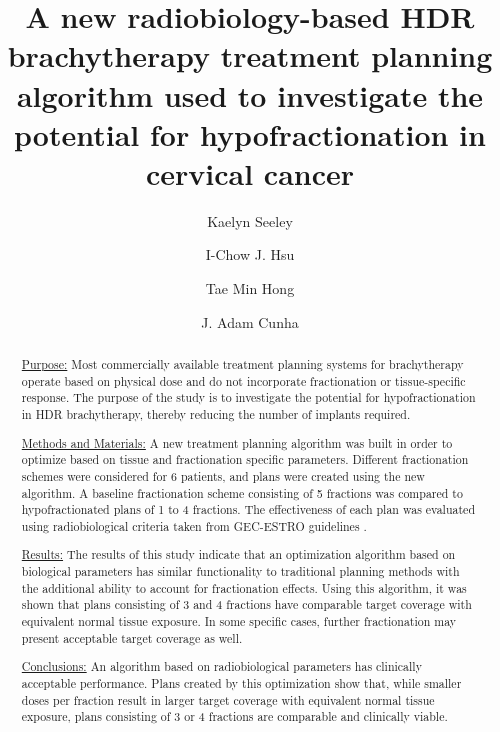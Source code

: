 \documentclass[osajnl,twocolumn,showpacs,superscriptaddress,10pt]{revtex4-1}
\begin{document}
\title{A new radiobiology-based HDR brachytherapy treatment planning algorithm used to investigate the potential for hypofractionation in cervical cancer}
\author{Kaelyn Seeley}
\author{I-Chow J. Hsu}
\author{Tae Min Hong}
\author{J. Adam Cunha}


\begin{abstract}
\setlength{\parindent}{0cm}
\underline{Purpose:} Most commercially available treatment planning systems for brachytherapy operate based on physical dose and do not incorporate fractionation or tissue-specific response. The purpose of the study is to investigate the potential for hypofractionation in HDR brachytherapy, thereby reducing the number of implants required.

\underline{Methods and Materials:} A new treatment planning algorithm was built in order to optimize based on tissue and fractionation specific parameters. Different fractionation schemes were considered for 6 patients, and plans were created using the new algorithm. A baseline fractionation scheme consisting of 5 fractions was compared to hypofractionated plans of 1 to 4 fractions. The effectiveness of each plan was evaluated using radiobiological criteria taken from GEC-ESTRO guidelines \cite{GECESTRO}. 

\underline{Results:} The results of this study indicate that an optimization algorithm based on biological parameters has similar functionality to traditional planning methods with the additional ability to account for fractionation effects. Using this algorithm, it was shown that plans consisting of 3 and 4 fractions have comparable target coverage with equivalent normal tissue exposure. In some specific cases, further fractionation may present acceptable target coverage as well. 

\underline{Conclusions:} An algorithm based on radiobiological parameters has clinically acceptable performance. Plans created by this optimization show that, while smaller doses per fraction result in larger target coverage with equivalent normal tissue exposure, plans consisting of 3 or 4 fractions are comparable and clinically viable. 
\end{abstract}
\end{document}
